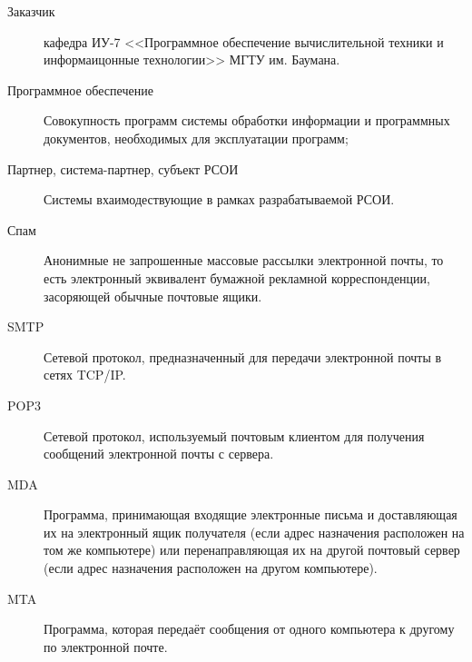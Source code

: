 \Defines %
\begin{description}
\item[Заказчик] кафедра ИУ-7 <<Программное обеспечение вычислительной техники и информаицонные технологии>> МГТУ им. Баумана.
\item[Программное обеспечение] Совокупность программ системы обработки информации и программных документов, необходимых для эксплуатации программ;
\item[Партнер, система-партнер, субъект РСОИ] Системы вхаимодествующие в рамках разрабатываемой РСОИ.
\item[Спам] Анонимные не запрошенные массовые рассылки электронной почты, то есть электронный эквивалент бумажной рекламной корреспонденции, засоряющей обычные почтовые ящики.
\item[SMTP] Сетевой протокол, предназначенный для передачи электронной почты в сетях TCP/IP.
\item[POP3] Сетевой протокол, используемый почтовым клиентом для получения сообщений электронной почты с сервера.
\item[MDA] Программа, принимающая входящие электронные письма и доставляющая их на электронный ящик получателя (если адрес назначения расположен на том же компьютере) или перенаправляющая их на другой почтовый сервер (если адрес назначения расположен на другом компьютере).
\item[MTA] Программа, которая передаёт сообщения от одного компьютера к другому по электронной почте.
\
\end{description}

